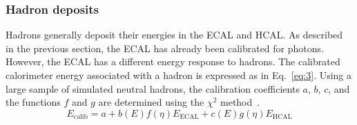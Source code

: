 


\subsubsection{Hadron deposits}
Hadrons generally deposit their energies in the ECAL and HCAL.
As described in the previous section, the ECAL has already been calibrated for photons.
However, the ECAL has a different energy response to hadrons.
The calibrated calorimeter energy associated with a hadron is expressed as in Eq.~\eqref{eq:3}.
Using a large sample of simulated neutral hadrons, the calibration coefficients $a$, $b$, $c$, and the functions $f$ and $g$ are determined using the $\chi^{2}$ method~\cite{PF}.
\begin{equation}
  E_\text{calib} = a + b(E)f(\eta)E_\text{ECAL} + c(E)g(\eta)E_\text{HCAL}
\label{eq:3}
\end{equation}
